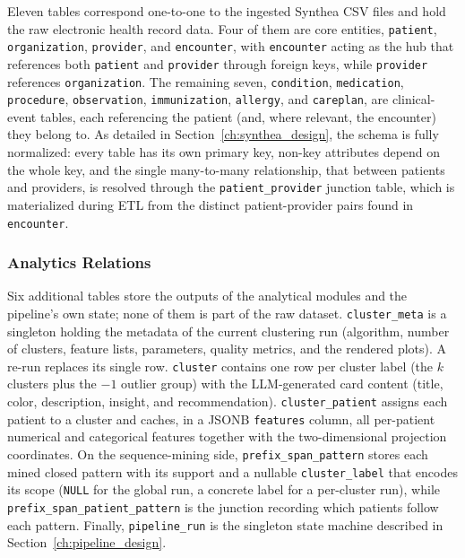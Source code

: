 Eleven tables correspond one-to-one to the ingested Synthea CSV files and hold the raw electronic health record data. Four of them are core entities, \texttt{patient}, \texttt{organization}, \texttt{provider}, and \texttt{encounter}, with \texttt{encounter} acting as the hub that references both \texttt{patient} and \texttt{provider} through foreign keys, while \texttt{provider} references \texttt{organization}. The remaining seven, \texttt{condition}, \texttt{medication}, \texttt{procedure}, \texttt{observation}, \texttt{immunization}, \texttt{allergy}, and \texttt{careplan}, are clinical-event tables, each referencing the patient (and, where relevant, the encounter) they belong to. As detailed in Section~\ref{ch:synthea_design}, the schema is fully normalized: every table has its own primary key, non-key attributes depend on the whole key, and the single many-to-many relationship, that between patients and providers, is resolved through the \texttt{patient\_provider} junction table, which is materialized during ETL from the distinct patient-provider pairs found in \texttt{encounter}.

\subsubsection*{Analytics Relations}

Six additional tables store the outputs of the analytical modules and the pipeline's own state; none of them is part of the raw dataset. \texttt{cluster\_meta} is a singleton holding the metadata of the current clustering run (algorithm, number of clusters, feature lists, parameters, quality metrics, and the rendered plots). A re-run replaces its single row. \texttt{cluster} contains one row per cluster label (the $k$ clusters plus the $-1$ outlier group) with the LLM-generated card content (title, color, description, insight, and recommendation). \texttt{cluster\_patient} assigns each patient to a cluster and caches, in a JSONB \texttt{features} column, all per-patient numerical and categorical features together with the two-dimensional projection coordinates. On the sequence-mining side, \texttt{prefix\_span\_pattern} stores each mined closed pattern with its support and a nullable \texttt{cluster\_label} that encodes its scope (\texttt{NULL} for the global run, a concrete label for a per-cluster run), while \texttt{prefix\_span\_patient\_pattern} is the junction recording which patients follow each pattern. Finally, \texttt{pipeline\_run} is the singleton state machine described in Section~\ref{ch:pipeline_design}.

